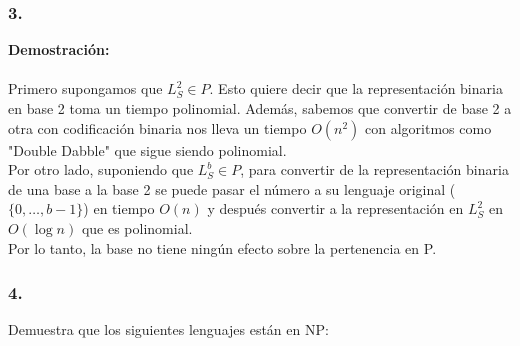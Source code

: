 \documentclass[12pt]{article}
\begin{document}
\subsubsection*{3.}
\textbf{Demostración:\\}
\\
Primero supongamos que $L_{S}^{2} \in P$.
Esto quiere decir que la representación binaria en base 2 toma un tiempo polinomial. Además,  sabemos que convertir de base 2 a otra con codificación binaria nos lleva un tiempo $O(n^2)$ con algoritmos como "Double Dabble" que sigue siendo polinomial.\\
Por otro lado, suponiendo que $L_{S}^{b} \in P$, para convertir de la representación binaria de una base a la base 2 se puede pasar el número a su lenguaje original ($\{0, \dots, b-1\}$) en tiempo $O(n)$ y después convertir a la representación en $L_{S}^{2}$ en $O(\log n)$ que es polinomial.\\
Por lo tanto, la base no tiene ningún efecto sobre la pertenencia en P. 
\subsubsection*{4.}

Demuestra que los siguientes lenguajes están en NP:
\end{document}
